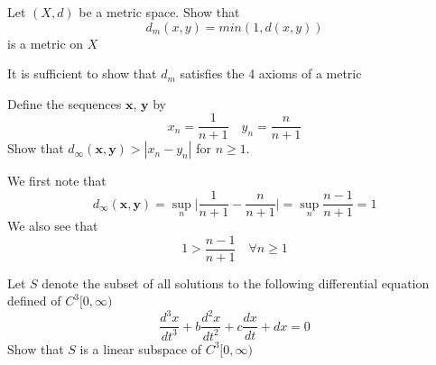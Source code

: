 \documentclass{homework}
\begin{document}
\begin{problem}[2-6]
  Let $(X,d)$ be a metric space. Show that
  \[d_m(x,y) = min(1, d(x,y))\]
  is a metric on $X$
\end{problem}

\begin{solution}
  It is sufficient to show that $d_m$ satisfies the 4 axioms of a metric

\end{solution}

\begin{problem}[2-7]
    Define the sequences $\mathbf{x}$, $\mathbf{y}$ by
    \[x_n = \frac{1}{n + 1} \quad y_n = \frac{n}{n + 1}\]
    Show that $d_{\infty}(\mathbf{x},\mathbf{y}) > |x_n - y_n|$ for $n\geq1$.
\end{problem}

\begin{solution}
  We first note that
  \[d_{\infty}(\mathbf{x},\mathbf{y}) = \sup_n \big\lvert\frac{1}{n+1} - \frac{n}{n+1}\big\rvert = \sup_n\frac{n - 1}{n+1} = 1\]
  We also see that 
  \[1 > \frac{n - 1}{n + 1} \quad \forall n \geq 1\]
\end{solution}

\begin{problem}[2-30]
  Let $S$ denote the subset  of all solutions to the following differential equation defined of $C^3[0, \infty)$
  \[ \frac{d^3x}{dt^3} + b\frac{d^2x}{dt^2} + c\frac{dx}{dt} + dx = 0\]
  Show that $S$ is a linear subspace of $C^3[0, \infty)$
\end{problem}
\end{document}
